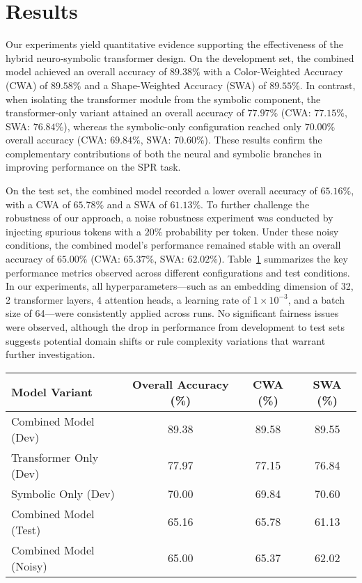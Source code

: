 \documentclass{article}
\begin{document}
\section{Results}
Our experiments yield quantitative evidence supporting the effectiveness of the hybrid neuro‐symbolic transformer design. On the development set, the combined model achieved an overall accuracy of \(89.38\%\) with a Color-Weighted Accuracy (CWA) of \(89.58\%\) and a Shape-Weighted Accuracy (SWA) of \(89.55\%\). In contrast, when isolating the transformer module from the symbolic component, the transformer-only variant attained an overall accuracy of \(77.97\%\) (CWA: \(77.15\%\), SWA: \(76.84\%\)), whereas the symbolic-only configuration reached only \(70.00\%\) overall accuracy (CWA: \(69.84\%\), SWA: \(70.60\%\)). These results confirm the complementary contributions of both the neural and symbolic branches in improving performance on the SPR task.

On the test set, the combined model recorded a lower overall accuracy of \(65.16\%\), with a CWA of \(65.78\%\) and a SWA of \(61.13\%\). To further challenge the robustness of our approach, a noise robustness experiment was conducted by injecting spurious tokens with a \(20\%\) probability per token. Under these noisy conditions, the combined model's performance remained stable with an overall accuracy of \(65.00\%\) (CWA: \(65.37\%\), SWA: \(62.02\%\)). Table~\ref{tab:results} summarizes the key performance metrics observed across different configurations and test conditions. In our experiments, all hyperparameters—such as an embedding dimension of 32, 2 transformer layers, 4 attention heads, a learning rate of \(1\times10^{-3}\), and a batch size of 64—were consistently applied across runs. No significant fairness issues were observed, although the drop in performance from development to test sets suggests potential domain shifts or rule complexity variations that warrant further investigation.

\begin{table}[h]
\centering
\begin{tabular}{lccc}
\hline
Model Variant & Overall Accuracy (\%) & CWA (\%) & SWA (\%) \\
\hline
Combined Model (Dev) & 89.38 & 89.58 & 89.55 \\
Transformer Only (Dev) & 77.97 & 77.15 & 76.84 \\
Symbolic Only (Dev) & 70.00 & 69.84 & 70.60 \\
Combined Model (Test) & 65.16 & 65.78 & 61.13 \\
Combined Model (Noisy) & 65.00 & 65.37 & 62.02 \\
\hline
\end{tabular}
\label{tab:results}
\end{table}
\end{document}
